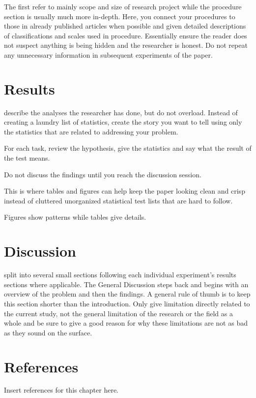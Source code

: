 The first refer to mainly scope and size of research project while the procedure section is usually much more in-depth. Here, you connect your procedures to those in already published articles when possible and given detailed descriptions of classifications and scales used in procedure. Essentially ensure the reader does not suspect anything is being hidden and the researcher is honest. Do not repeat any unnecessary information in subsequent experiments of the paper.



\section{Results}

describe the analyses the researcher has done, but do not overload. Instead of creating a laundry list of statistics, create the story you want to tell using only the statistics that are related to addressing your problem. 

For each task, review the hypothesis, give the statistics and say what the result of the test means. 

Do not discuss the findings until you reach the discussion session. 

This is where tables and figures can help keep the paper looking clean and crisp instead of cluttered unorganized statistical test lists that are hard to follow. 

Figures show patterns while tables give details.



\section{Discussion}

split into several small sections following each individual experiment’s results sections where applicable. 
The General Discussion steps back and begins with an overview of the problem and then the findings. A general rule of thumb is to keep this section shorter than the introduction. Only give limitation directly related to the current study, not the general limitation of the research or the field as a whole and be sure to give a good reason for why these limitations are not as bad as they sound on the surface.



\section{References}

Insert references for this chapter here.
